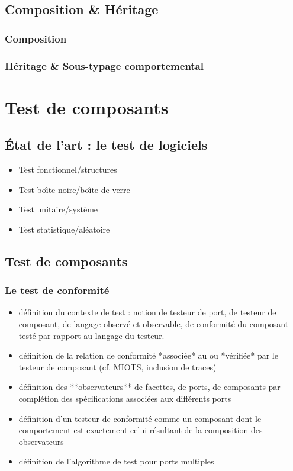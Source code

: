 \documentclass[french,a4paper,leqno,twoside]{book}
\begin{document}
\chapter{Composition \& H\'eritage}

\section{Composition}

\section{H\'eritage \& Sous-typage comportemental}

\part{Test de composants} 

\chapter{\'Etat de l'art : le test de logiciels}

\begin{itemize}
  \item Test fonctionnel/structures
  \item Test bo\^{\i}te noire/bo\^{\i}te de verre
  \item Test unitaire/syst\`eme
  \item Test statistique/al\'eatoire
\end{itemize}

\chapter{Test de composants}

\section{Le test de conformit\'e}
\begin{itemize}
  \item d\'efinition du contexte de test : notion de testeur de port,
    de testeur de composant, de langage observ\'e et observable, de
    conformit\'e du composant test\'e par rapport au langage du
    testeur.
  \item d\'efinition de la relation de conformit\'e *associ\'ee* au
    ou *v\'erifi\'ee* par le testeur de composant (cf. MIOTS,
    inclusion de traces)
  \item d\'efinition des **observateurs** de facettes, de ports, de
    composants par compl\'etion des sp\'ecifications associ\'ees
    aux diff\'erents ports
  \item d\'efinition d'un testeur de conformit\'e comme un composant
    dont le comportement est exactement celui r\'esultant de la
    composition des observateurs
  \item d\'efinition de l'algorithme de test pour ports multiples
\end{itemize} 
\end{document}
